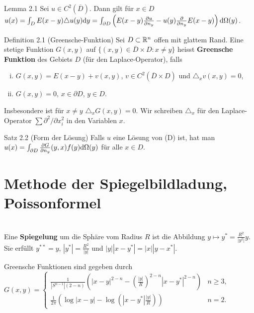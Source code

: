 \begin{namedtheorem}{Lemma 2.1}
  Sei $u\in C^2(\overline{D})$. Dann gilt für $x\in D$ $u(x)=\int_D E(x-y) \triangle u(y) \mathrm{d} y = \int_{\partial D} \left(E(x-y)\frac{\partial u}{\partial n_y} - u(y)\frac{\partial}{\partial n_y} E(x-y) \right) \mathrm{d} \Omega(y)$.
\end{namedtheorem}

\begin{namedtheorem}{Definition 2.1 (Greensche-Funktion)}
  Sei $D\subset\mathbb{R}^n$ offen mit glattem Rand. Eine stetige Funktion $G(x,y)$ auf $\{(x,y)\in \overline{D}\times D: x\neq y\}$ heisst \textbf{Greensche Funktion} des Gebiets $D$ (für den Laplace-Operator), falls
  \begin{enumerate}[(i)]
    \item $G(x,y)=E(x-y) + v(x,y)$, $v\in C^2(\overline{D}\times D)$ und $\triangle_x v(x,y)=0$,
    \item $G(x,y)=0$, $x\in\partial D$, $y\in D$.
  \end{enumerate}
  Insbesondere ist für $x\neq y$ $\triangle_x G(x,y)=0$. Wir schreiben $\triangle_x$ für den Laplace-Operator $\sum\partial^2/\partial x_i^2$ in den Variablen $x$.
\end{namedtheorem}

\begin{namedtheorem}{Satz 2.2 (Form der Lösung)}
  Falls $u$ eine Lösung von (D) ist, hat man $u(x) = \int_{\partial D}\frac{\partial G}{\partial n_y}(y,x)f(y)\mathrm{d} \Omega(y)$ für alle $x\in D$.
\end{namedtheorem}

\section{Methode der Spiegelbildladung, Poissonformel}
\hfill \\
Eine \textbf{Spiegelung} um die Sphäre vom Radius $R$ ist die Abbildung $y\mapsto y^{\ast}=\frac{R^2}{|y^2|}y$. Sie erfüllt $y^{\ast\ast}=y$, $|y^{\ast}|=\frac{R^2}{|y|}$ und $|y||x-y^{\ast}|=|x||y-x^{\ast}|$.

\begin{namedtheorem}{Greensche Funktionen} sind gegeben durch \\
$G(x,y)=\begin{cases}
	\frac1{|S^{n-1}|(2-n)}\left(|x-y|^{2-n}-\left(\frac{|y|}R\right)^{2-n}|x-y^{\ast}|^{2-n}\right) & n\geq3,\\
	\frac1{2\pi}(\log|x-y|-\log(|x-y^{\ast}|\frac{|y|}R)) & n=2.
\end{cases}$
\end{namedtheorem}

